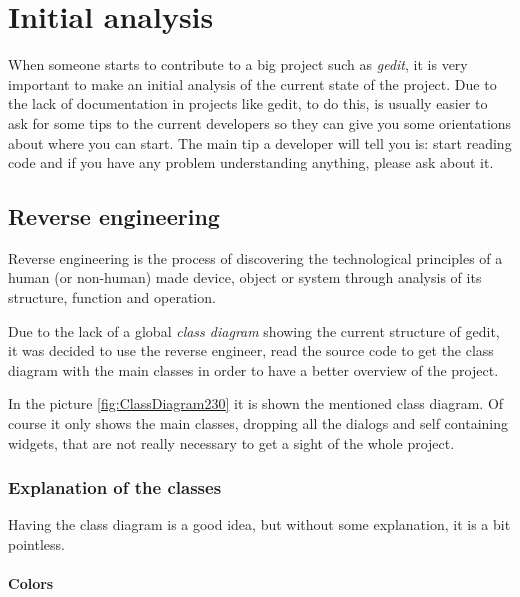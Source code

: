 
\chapter{Initial analysis}\label{chap:InitialAnalysis}


When someone starts to contribute to a big project such as \emph{gedit}, it is very important to make an initial analysis of the current state of the project. Due to the lack of documentation in projects like gedit, to do this, is usually easier to ask for some tips to the current developers so they can give you some orientations about where you can start. The main tip a developer will tell you is: start reading code and if you have any problem understanding anything, please ask about it.

\section{Reverse engineering}\label{ReverseEngineering}

Reverse engineering is the process of discovering the technological principles of a human (or non-human) made device, object or system through analysis of its structure, function and operation.\cite{website:reverse-engineer}

Due to the lack of a global \emph{class diagram} showing the current structure of gedit, it was decided to use the reverse engineer, read the source code to get the class diagram with the main classes in order to have a better overview of the project.

In the picture \ref{fig:ClassDiagram230} it is shown the mentioned class diagram. Of course it only shows the main classes, dropping all the dialogs and self containing widgets, that are not really necessary to get a sight of the whole project.

\newpage
{}

\subsection{Explanation of the classes}

Having the class diagram is a good idea, but without some explanation, it is a bit pointless.

\subsubsection{Colors}

